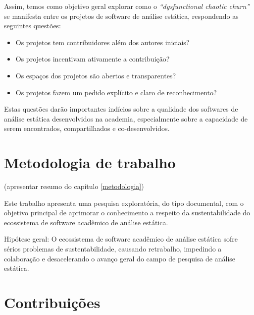 Assim, temos como objetivo geral explorar como o {\it ``dysfunctional chaotic
churn''} se manifesta entre os projetos de software de análise estática,
respondendo as seguintes questões:

\begin{itemize}
  \item Os projetos tem contribuidores além dos autores iniciais?
  \item Os projetos incentivam ativamente a contribuição?
  \item Os espaços dos projetos são abertos e transparentes?
  \item Os projetos fazem um pedido explícito e claro de reconhecimento?
\end{itemize}



Estas questões darão importantes indícios sobre a qualidade dos softwares de
análise estática desenvolvidos na academia, especialmente sobre a capacidade de
serem encontrados, compartilhados e co-desenvolvidos.

\section{Metodologia de trabalho}

(apresentar resumo do capítulo \ref{metodologia})

%
Este trabalho apresenta uma pesquisa exploratória, do tipo documental, com o
objetivo principal de aprimorar o conhecimento a respeito da sustentabilidade
do ecossistema de software acadêmico de análise estática.

Hipótese geral: O ecossistema de software acadêmico de análise
estática sofre sérios problemas de sustentabilidade, causando retrabalho,
impedindo a colaboração e desacelerando o avanço geral do campo de pesquisa de
análise estática.


\section{Contribuições}

